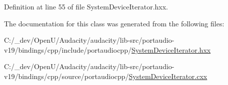 Definition at line 55 of file System\+Device\+Iterator.\+hxx.



The documentation for this class was generated from the following files\+:\begin{DoxyCompactItemize}
\item 
C\+:/\+\_\+dev/\+Open\+U/\+Audacity/audacity/lib-\/src/portaudio-\/v19/bindings/cpp/include/portaudiocpp/\hyperlink{_system_device_iterator_8hxx}{System\+Device\+Iterator.\+hxx}\item 
C\+:/\+\_\+dev/\+Open\+U/\+Audacity/audacity/lib-\/src/portaudio-\/v19/bindings/cpp/source/portaudiocpp/\hyperlink{_system_device_iterator_8cxx}{System\+Device\+Iterator.\+cxx}\end{DoxyCompactItemize}
